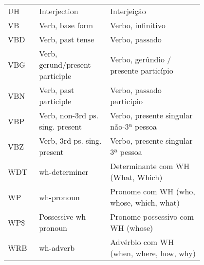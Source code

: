 \begin{longtable}{|p{0.1\linewidth}|p{0.3\linewidth}|p{0.4\linewidth}|}
        UH & Interjection & Interjeição\\
        VB & Verb, base form & Verbo, infinitivo\\
        VBD & Verb, past tense & Verbo, passado\\
        VBG & Verb, gerund/present participle & Verbo, gerûndio / presente particípio\\
        VBN & Verb, past participle & Verbo, passado particípio\\
        VBP & Verb, non-3rd ps. sing. present & Verbo, presente singular não-3ª pessoa\\
        VBZ & Verb, 3rd ps. sing. present & Verbo, presente singular 3ª pessoa\\
        WDT & wh-determiner & Determinante com WH (What, Which)\\
        WP & wh-pronoun & Pronome com WH (who, whose, which, what)\\
        WP\$ & Possessive wh-pronoun & Pronome possessivo com WH (whose)\\
        WRB & wh-adverb & Advérbio com WH (when, where, how, why)
\end{longtable}
    \label{tab:tags_ptb}